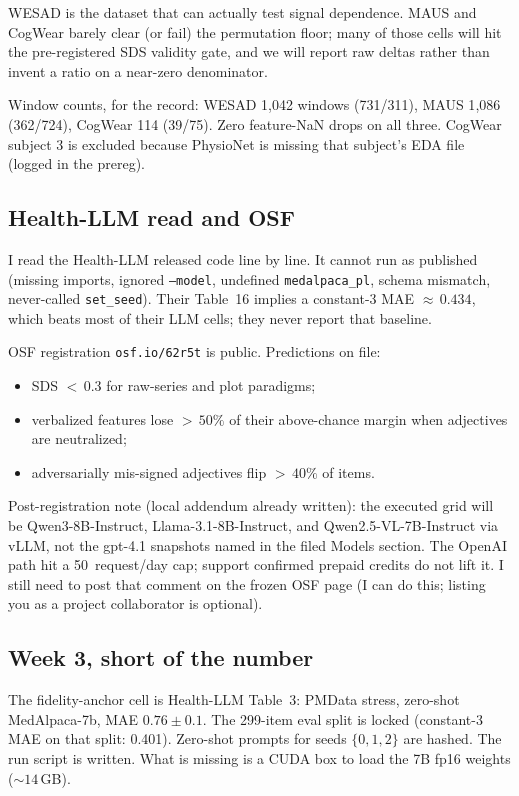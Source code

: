 \documentclass[11pt]{article}
\begin{document}
WESAD is the dataset that can actually test signal dependence. MAUS and CogWear barely clear (or fail) the permutation floor; many of those cells will hit the pre-registered SDS validity gate, and we will report raw deltas rather than invent a ratio on a near-zero denominator.

Window counts, for the record: WESAD 1{,}042 windows (731/311), MAUS 1{,}086 (362/724), CogWear 114 (39/75). Zero feature-NaN drops on all three. CogWear subject 3 is excluded because PhysioNet is missing that subject's EDA file (logged in the prereg).

\subsection{Health-LLM read and OSF}

I read the Health-LLM released code line by line. It cannot run as published (missing imports, ignored \texttt{--model}, undefined \texttt{medalpaca\_pl}, schema mismatch, never-called \texttt{set\_seed}). Their Table~16 implies a constant-3 MAE ${\approx}\,0.434$, which beats most of their LLM cells; they never report that baseline.

OSF registration \texttt{osf.io/62r5t} is public. Predictions on file:
\begin{itemize}\setlength{\itemsep}{0.15em}
  \item SDS ${<}\,0.3$ for raw-series and plot paradigms;
  \item verbalized features lose ${>}\,50\%$ of their above-chance margin when adjectives are neutralized;
  \item adversarially mis-signed adjectives flip ${>}\,40\%$ of items.
\end{itemize}

Post-registration note (local addendum already written): the executed grid will be Qwen3-8B-Instruct, Llama-3.1-8B-Instruct, and Qwen2.5-VL-7B-Instruct via vLLM, not the gpt-4.1 snapshots named in the filed Models section. The OpenAI path hit a 50~request/day cap; support confirmed prepaid credits do not lift it. I still need to post that comment on the frozen OSF page (I can do this; listing you as a project collaborator is optional).

\subsection{Week 3, short of the number}

The fidelity-anchor cell is Health-LLM Table~3: PMData stress, zero-shot MedAlpaca-7b, MAE $0.76\pm 0.1$. The 299-item eval split is locked (constant-3 MAE on that split: 0.401). Zero-shot prompts for seeds $\{0,1,2\}$ are hashed. The run script is written. What is missing is a CUDA box to load the 7B fp16 weights (${\sim}14$\,GB).
\end{document}
